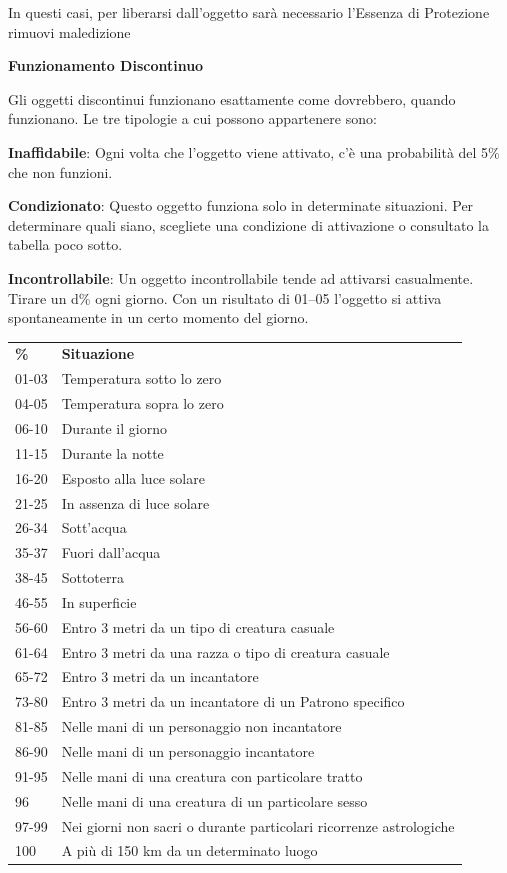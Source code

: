 \documentclass[a4paper,11pt,twoside,openany]{book}
\begin{document}
In questi casi, per liberarsi dall'oggetto sarà necessario l'Essenza di Protezione rimuovi maledizione

\textbf{Funzionamento Discontinuo}

Gli oggetti discontinui funzionano esattamente come dovrebbero, quando funzionano. Le tre tipologie a cui possono appartenere sono:

\textbf{Inaffidabile}: Ogni volta che l'oggetto viene attivato, c'è una probabilità del 5\% che non funzioni.

\textbf{Condizionato}: Questo oggetto funziona solo in determinate situazioni. Per determinare quali siano, scegliete una condizione di attivazione o consultato la tabella poco sotto.

\textbf{Incontrollabile}: Un oggetto incontrollabile tende ad attivarsi casualmente. Tirare un d\% ogni giorno. Con un risultato di 01--05 l'oggetto si attiva spontaneamente in un certo momento del giorno.

\bigskip

\begin{tabularx}{0.95\textwidth}{lX}
	\toprule
	\textbf{\%} & \textbf{Situazione}\\
	01-03       & Temperatura sotto lo zero\\
	04-05       & Temperatura sopra lo zero\\
	06-10       & Durante il giorno\\
	11-15       & Durante la notte\\
	16-20       & Esposto alla luce solare\\
	21-25       & In assenza di luce solare\\
	26-34       & Sott'acqua\\
	35-37       & Fuori dall'acqua\\
	38-45       & Sottoterra\\
	46-55       & In superficie\\
	56-60       & Entro 3 metri da un tipo di creatura casuale\\
	61-64       & Entro 3 metri da una razza o tipo di creatura casuale\\
	65-72       & Entro 3 metri da un incantatore\\
	73-80       & Entro 3 metri da un incantatore di un Patrono specifico\\
	81-85       & Nelle mani di un personaggio non incantatore\\
	86-90       & Nelle mani di un personaggio incantatore\\
	91-95       & Nelle mani di una creatura con particolare tratto\\
	96          & Nelle mani di una creatura di un particolare sesso\\
	97-99       & Nei giorni non sacri o durante particolari ricorrenze astrologiche\\
	100         & A più di 150 km da un determinato luogo\\
\end{tabularx}
\end{document}
